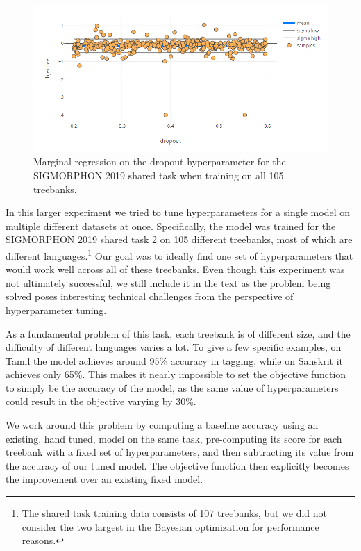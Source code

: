 \begin{figure}
	\begin{center}
		\includegraphics[width=1.0\textwidth]{images/sigmorphon-dropout.png}
		\caption{Marginal regression on the dropout hyperparameter for the SIGMORPHON 2019 shared task when training on all 105 treebanks.}
		\label{figure:sigmorphon-dropout}
	\end{center}
\end{figure}

In this larger experiment we tried to tune hyperparameters for a single model on multiple different datasets at once. Specifically, the model was trained for the SIGMORPHON 2019 shared task 2 \citep{sigmorphon2019task2} on 105 different treebanks, most of which are different languages.\footnote{The shared task training data consists of 107 treebanks, but we did not consider the two largest in the Bayesian optimization for performance reasons.} Our goal was to ideally find one set of hyperparameters that would work well across all of these treebanks. Even though this experiment was not ultimately successful, we still include it in the text as the problem being solved poses interesting technical challenges from the perspective of hyperparameter tuning.

As a fundamental problem of this task, each treebank is of different size, and the difficulty of different languages varies a lot. To give a few specific examples, on Tamil the model achieves around 95\% accuracy in tagging, while on Sanskrit it achieves only 65\%. This makes it nearly impossible to set the objective function to simply be the accuracy of the model, as the same value of hyperparameters could result in the objective varying by 30\%.

We work around this problem by computing a baseline accuracy using an existing, hand tuned, model on the same task, pre-computing its score for each treebank with a fixed set of hyperparameters, and then subtracting its value from the accuracy of our tuned model. The objective function then explicitly becomes the improvement over an existing fixed model.

